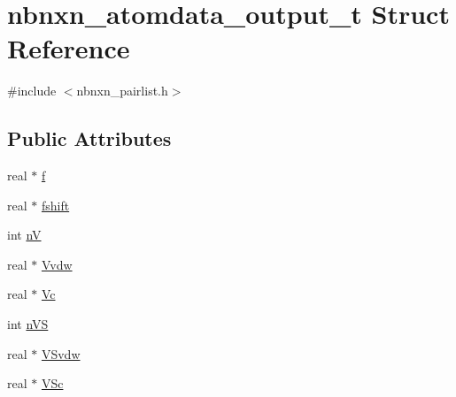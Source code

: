 \hypertarget{structnbnxn__atomdata__output__t}{\section{nbnxn\-\_\-atomdata\-\_\-output\-\_\-t \-Struct \-Reference}
\label{structnbnxn__atomdata__output__t}
}


{\ttfamily \#include $<$nbnxn\-\_\-pairlist.\-h$>$}

\subsection*{\-Public \-Attributes}
\begin{DoxyCompactItemize}
\item 
real $\ast$ \hyperlink{structnbnxn__atomdata__output__t_a6768a7f9020ac72b325105dd029d96ed}{f}
\item 
real $\ast$ \hyperlink{structnbnxn__atomdata__output__t_a048d9992a6df3ad14bc93d6b9d1daede}{fshift}
\item 
int \hyperlink{structnbnxn__atomdata__output__t_aab26a5b28a84ab104f4188f57514217a}{n\-V}
\item 
real $\ast$ \hyperlink{structnbnxn__atomdata__output__t_adefd315070f08b8425e7c274337af689}{\-Vvdw}
\item 
real $\ast$ \hyperlink{structnbnxn__atomdata__output__t_a623138b0a063d684b778cc672fef0817}{\-Vc}
\item 
int \hyperlink{structnbnxn__atomdata__output__t_a8fefe773afd8158806ff44636930c33b}{n\-V\-S}
\item 
real $\ast$ \hyperlink{structnbnxn__atomdata__output__t_aac4a29f4ceb0a703f5a64fca44657ab6}{\-V\-Svdw}
\item 
real $\ast$ \hyperlink{structnbnxn__atomdata__output__t_a3c935eb1f563af167c65a9a171a255ed}{\-V\-Sc}
\end{DoxyCompactItemize}


